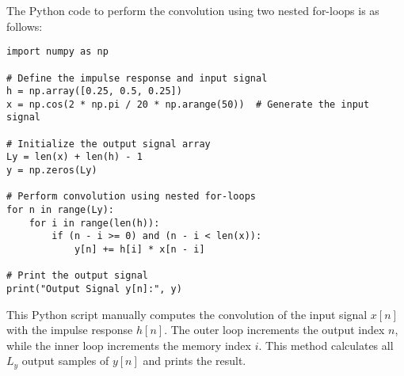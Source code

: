 
\item[(b)]
The Python code to perform the convolution using two nested for-loops is as follows:

\begin{verbatim}
import numpy as np

# Define the impulse response and input signal
h = np.array([0.25, 0.5, 0.25])
x = np.cos(2 * np.pi / 20 * np.arange(50))  # Generate the input signal

# Initialize the output signal array
Ly = len(x) + len(h) - 1
y = np.zeros(Ly)

# Perform convolution using nested for-loops
for n in range(Ly):
    for i in range(len(h)):
        if (n - i >= 0) and (n - i < len(x)):
            y[n] += h[i] * x[n - i]

# Print the output signal
print("Output Signal y[n]:", y)
\end{verbatim}

This Python script manually computes the convolution of the input signal $x[n]$ with the impulse response $h[n]$.
The outer loop increments the output index $n$, while the inner loop increments the memory index $i$.
This method calculates all $L_y$ output samples of $y[n]$ and prints the result.
